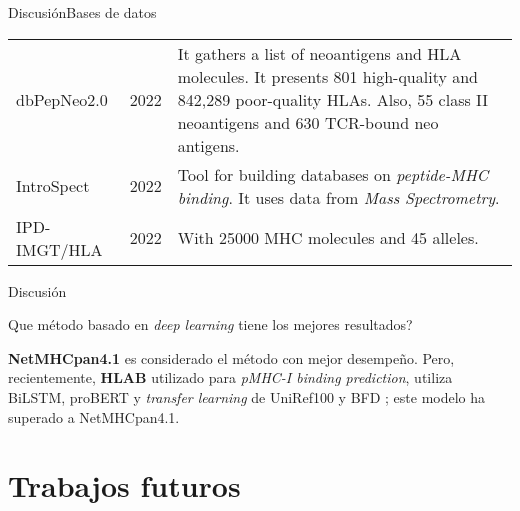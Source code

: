 \documentclass[10pt]{beamer}
\newcommand{\1}{
	\setbeamertemplate{background}{
		\texttt{[image: img/1]}
		\tikz[overlay] \fill[fill opacity=0.75,fill=white] (0,0) rectangle (-\paperwidth,\paperheight);
	}
}
\begin{document}
\begin{frame}{Discusión}{Bases de datos}
\begin{table}[]
{\begin{tabular}{p{1.7cm}p{1.2cm}p{6.5cm}}
				\\
				dbPepNeo2.0    & 2022 \cite{lu2022dbpepneo2}                                          &
				It gathers a list of neoantigens and HLA molecules. It presents 801 high-quality and 842,289 poor-quality HLAs. Also, 55 class II neoantigens and 630 TCR-bound neo antigens.
				\\
				IntroSpect      & 2022 \cite{zhang2022introspect}                                      & Tool for building databases on \textit{peptide-MHC binding}. It uses data from \textit{Mass Spectrometry}.   \\
				
				IPD-IMGT/HLA & 2022 \cite{robinson2020ipd}    &    With 25000 MHC molecules and 45 alleles.                                                                
			\end{tabular}
		}
	\end{table}	
\end{frame}


\begin{frame}{Discusión}{}
	\begin{block}{Que método basado en \textit{deep learning} tiene los mejores resultados? }
		
		\textbf{NetMHCpan4.1} es considerado el método con mejor desempeño. Pero, recientemente, \textbf{HLAB} \cite{zhang2022hlab} utilizado para \textit{pMHC-I binding prediction},  utiliza  BiLSTM, proBERT y \textit{transfer learning} de UniRef100 \cite{suzek2015uniref} y BFD \cite{steinegger2018clustering}; este modelo ha superado a NetMHCpan4.1. 
	\end{block}	
\end{frame}

\section{Trabajos futuros}
\end{document}
